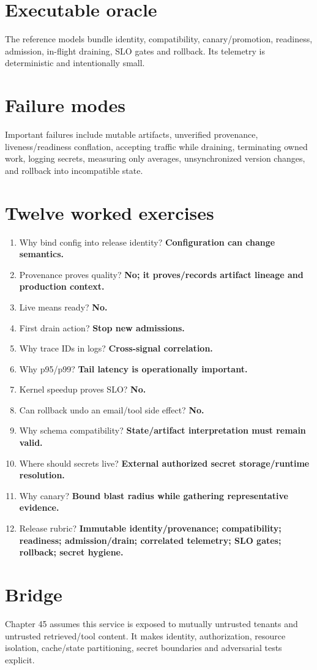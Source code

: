 \section{Executable oracle}
The reference models bundle identity, compatibility, canary/promotion, readiness, admission, in-flight draining, SLO gates and rollback. Its telemetry is deterministic and intentionally small.

\section{Failure modes}
Important failures include mutable artifacts, unverified provenance, liveness/readiness conflation, accepting traffic while draining, terminating owned work, logging secrets, measuring only averages, unsynchronized version changes, and rollback into incompatible state.

\section{Twelve worked exercises}
\begin{enumerate}
\item Why bind config into release identity? \textbf{Configuration can change semantics.}
\item Provenance proves quality? \textbf{No; it proves/records artifact lineage and production context.}
\item Live means ready? \textbf{No.}
\item First drain action? \textbf{Stop new admissions.}
\item Why trace IDs in logs? \textbf{Cross-signal correlation.}
\item Why p95/p99? \textbf{Tail latency is operationally important.}
\item Kernel speedup proves SLO? \textbf{No.}
\item Can rollback undo an email/tool side effect? \textbf{No.}
\item Why schema compatibility? \textbf{State/artifact interpretation must remain valid.}
\item Where should secrets live? \textbf{External authorized secret storage/runtime resolution.}
\item Why canary? \textbf{Bound blast radius while gathering representative evidence.}
\item Release rubric? \textbf{Immutable identity/provenance; compatibility; readiness; admission/drain; correlated telemetry; SLO gates; rollback; secret hygiene.}
\end{enumerate}

\section{Bridge}
Chapter 45 assumes this service is exposed to mutually untrusted tenants and untrusted retrieved/tool content. It makes identity, authorization, resource isolation, cache/state partitioning, secret boundaries and adversarial tests explicit.
